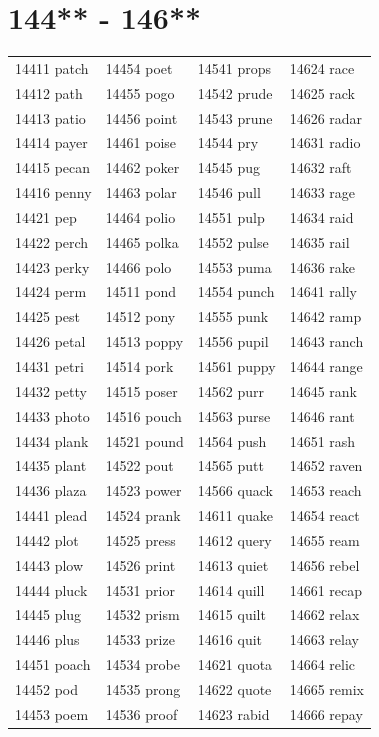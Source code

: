 \documentclass[10pt, oneside]{book}
\begin{document}
\begin{table}
	\centering
	\section*{144** - 146**}
	\begin{tabular}{l l l l}
14411 patch &14454 poet &14541 props &14624 race\\
14412 path &14455 pogo &14542 prude &14625 rack\\
14413 patio &14456 point &14543 prune &14626 radar\\
14414 payer &14461 poise &14544 pry &14631 radio\\
14415 pecan &14462 poker &14545 pug &14632 raft\\
14416 penny &14463 polar &14546 pull &14633 rage\\
14421 pep &14464 polio &14551 pulp &14634 raid\\
14422 perch &14465 polka &14552 pulse &14635 rail\\
14423 perky &14466 polo &14553 puma &14636 rake\\
14424 perm &14511 pond &14554 punch &14641 rally\\
14425 pest &14512 pony &14555 punk &14642 ramp\\
14426 petal &14513 poppy &14556 pupil &14643 ranch\\
14431 petri &14514 pork &14561 puppy &14644 range\\
14432 petty &14515 poser &14562 purr &14645 rank\\
14433 photo &14516 pouch &14563 purse &14646 rant\\
14434 plank &14521 pound &14564 push &14651 rash\\
14435 plant &14522 pout &14565 putt &14652 raven\\
14436 plaza &14523 power &14566 quack &14653 reach\\
14441 plead &14524 prank &14611 quake &14654 react\\
14442 plot &14525 press &14612 query &14655 ream\\
14443 plow &14526 print &14613 quiet &14656 rebel\\
14444 pluck &14531 prior &14614 quill &14661 recap\\
14445 plug &14532 prism &14615 quilt &14662 relax\\
14446 plus &14533 prize &14616 quit &14663 relay\\
14451 poach &14534 probe &14621 quota &14664 relic\\
14452 pod &14535 prong &14622 quote &14665 remix\\
14453 poem &14536 proof &14623 rabid &14666 repay\\
	\end{tabular}
 \end{table}
\clearpage
\end{document}
